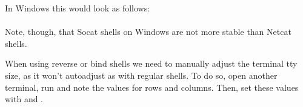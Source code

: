 \documentclass[../../WriteUp.tex]{subfiles}
\begin{document}
{\begin{enumerate}
In Windows this would look as follows:\\
\\
Note, though, that Socat shells on Windows are not more stable than Netcat shells.
\end{enumerate}
When using reverse or bind shells we need to manually adjust the terminal tty size, as it won't autoadjust as with regular shells. To do so, open another terminal, run  and note the values for rows and columns. Then, set these values with  and .

}
\end{document}

